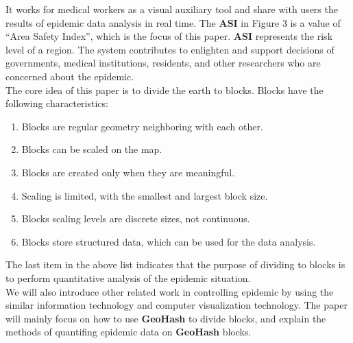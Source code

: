 \documentclass[sigplan,screen]{acmart}
\begin{document}
It works for medical workers as a visual auxiliary tool and share with users the results of epidemic data analysis in real time.
The \textbf{ASI} in Figure 3 is a value of ``Area Safety Index'', which is the focus of this paper.
\textbf{ASI} represents the risk level of a region.
The system contributes to enlighten and support decisions of governments, medical institutions, residents, and other researchers who are concerned about the epidemic.
\\
The core idea of this paper is to divide the earth to blocks. Blocks have the following characteristics:
\begin{enumerate}
	\item Blocks are regular geometry neighboring with each other.
	\item Blocks can be scaled on the map.
	\item Blocks are created only when they are meaningful.
	\item Scaling is limited, with the smallest and largest block size.
	\item Blocks scaling levels are discrete sizes, not continuous.
	\item Blocks store structured data, which can be used for the data analysis.
\end{enumerate}
The last item in the above list indicates that the purpose of dividing to blocks is to perform quantitative analysis of the epidemic situation.
\\
We will also introduce other related work in controlling epidemic by using the similar information technology and computer visualization technology.
The paper will mainly focus on how to use \textbf{GeoHash} to divide blocks, and explain the methods of quantifing epidemic data on \textbf{GeoHash} blocks.
\end{document}

